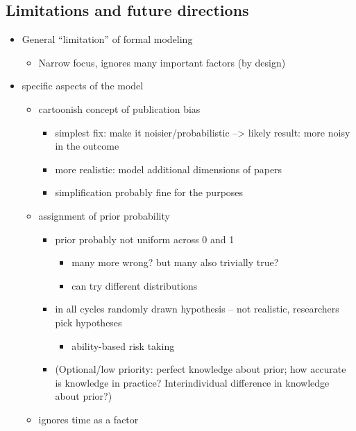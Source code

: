 \documentclass[
  ,man,mask,floatsintext]{apa6}
\providecommand{\tightlist}{%
  \setlength{\itemsep}{0pt}\setlength{\parskip}{0pt}}
\begin{document}
\hypertarget{limitations-and-future-directions}{%
\subsection{Limitations and future directions}\label{limitations-and-future-directions}}

\begin{itemize}
\item
  General ``limitation'' of formal modeling

  \begin{itemize}
  \tightlist
  \item
    Narrow focus, ignores many important factors (by design)
  \end{itemize}
\item
  specific aspects of the model

  \begin{itemize}
  \tightlist
  \item
    cartoonish concept of publication bias

    \begin{itemize}
    \tightlist
    \item
      simplest fix: make it noisier/probabilistic --\textgreater{} likely result: more noisy in the outcome
    \item
      more realistic: model additional dimensions of papers
    \item
      simplification probably fine for the purposes
    \end{itemize}
  \item
    assignment of prior probability

    \begin{itemize}
    \tightlist
    \item
      prior probably not uniform across 0 and 1

      \begin{itemize}
      \tightlist
      \item
        many more wrong? but many also trivially true?
      \item
        can try different distributions
      \end{itemize}
    \item
      in all cycles randomly drawn hypothesis -- not realistic, researchers pick hypotheses

      \begin{itemize}
      \tightlist
      \item
        ability-based risk taking
      \end{itemize}
    \item
      (Optional/low priority: perfect knowledge about prior; how accurate is knowledge in practice? Interindividual difference in knowledge about prior?)
    \end{itemize}
  \item
    ignores time as a factor


\end{itemize}
\end{itemize}
\end{document}
